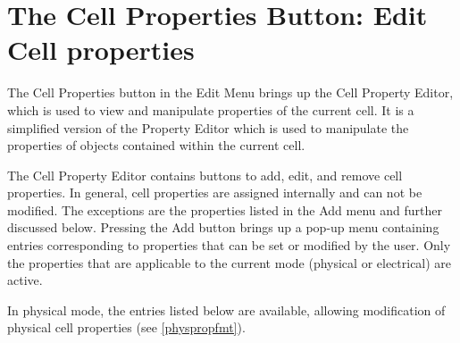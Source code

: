 \section{The {\cb Cell Properties} Button: Edit Cell properties}
The {\cb Cell Properties} button in the {\cb Edit Menu} brings up the
{\cb Cell Property Editor}, which is used to view and manipulate
properties of the current cell.  It is a simplified version of the
{\cb Property Editor} which is used to manipulate the properties of
objects contained within the current cell.

The {\cb Cell Property Editor} contains buttons to add, edit, and
remove cell properties.  In general, cell properties are assigned
internally and can not be modified.  The exceptions are the
properties listed in the {\cb Add} menu and further discussed below. 
Pressing the {\cb Add} button brings up a pop-up menu containing
entries corresponding to properties that can be set or modified by
the user.  Only the properties that are applicable to the current
mode (physical or electrical) are active.

In physical mode, the entries listed below are available, allowing
modification of physical cell properties (see \ref{physpropfmt}).

